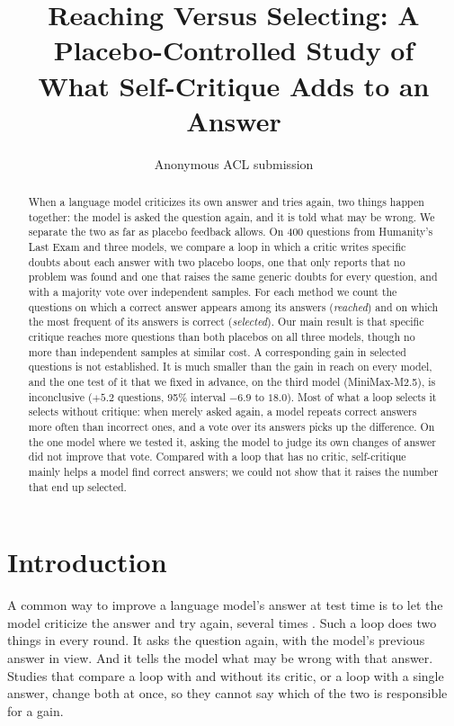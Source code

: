 \documentclass[11pt]{article}
\title{Reaching Versus Selecting: A Placebo-Controlled Study of\\What Self-Critique Adds to an Answer}
\author{Anonymous ACL submission}
\begin{document}
\maketitle

\begin{abstract}
When a language model criticizes its own answer and tries again, two things happen together: the model is asked the question again, and it is told what may be wrong.
We separate the two as far as placebo feedback allows.
On 400 questions from Humanity's Last Exam and three models, we compare a loop in which a critic writes specific doubts about each answer with two placebo loops, one that only reports that no problem was found and one that raises the same generic doubts for every question, and with a majority vote over independent samples.
For each method we count the questions on which a correct answer appears among its answers (\emph{reached}) and on which the most frequent of its answers is correct (\emph{selected}).
Our main result is that specific critique reaches more questions than both placebos on all three models, though no more than independent samples at similar cost.
A corresponding gain in selected questions is not established.
It is much smaller than the gain in reach on every model, and the one test of it that we fixed in advance, on the third model (MiniMax-M2.5), is inconclusive ($+5.2$ questions, 95\% interval $-6.9$ to $18.0$).
Most of what a loop selects it selects without critique: when merely asked again, a model repeats correct answers more often than incorrect ones, and a vote over its answers picks up the difference.
On the one model where we tested it, asking the model to judge its own changes of answer did not improve that vote.
Compared with a loop that has no critic, self-critique mainly helps a model find correct answers; we could not show that it raises the number that end up selected.
\end{abstract}

\section{Introduction}

A common way to improve a language model's answer at test time is to let the model criticize the answer and try again, several times \citep{madaan2023selfrefine,shinn2023reflexion}.
Such a loop does two things in every round.
It asks the question again, with the model's previous answer in view.
And it tells the model what may be wrong with that answer.
Studies that compare a loop with and without its critic, or a loop with a single answer, change both at once, so they cannot say which of the two is responsible for a gain.
\end{document}
